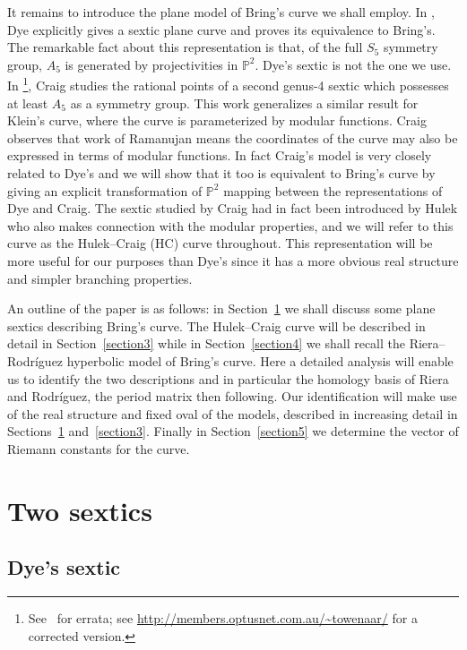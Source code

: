 \documentclass[pdftex]{sigma}
\numberwithin{equation}{section}
\begin{document}
It remains to introduce the plane model of Bring's curve we shall employ. In \cite{dye}, Dye
explicitly gives a sextic plane curve and proves its equivalence to Bring's.
The remarkable fact about this representation is that, of the full $S_5$ symmetry group, $A_5$ is
generated by projectivities in $\mathbb{P}^2$. Dye's sextic is not the one we use.
In \cite{craig}\footnote{See~\cite{craig04} for errata; see
 \url{http://members.optusnet.com.au/~towenaar/} for a corrected version.}, Craig studies the rational points of a second genus-4
sextic which possesses at least $A_5$ as a symmetry group. This work generalizes a similar
result for Klein's curve, where the curve is parameterized by modular functions. Craig
observes that work of Ramanujan means the coordinates of the curve may also be expressed in terms
of modular functions. In fact
Craig's model is very closely related to Dye's and we will
show that it too is equivalent to Bring's curve by giving an explicit
transformation of $\mathbb{P}^2$ mapping between the representations of Dye and Craig.
The sextic studied by Craig had in fact been introduced by Hulek \cite[p.~82]{hulek85}
who also makes connection with the modular properties, and we will refer to this curve as the Hulek--Craig
(HC) curve throughout. This representation will be more useful for our purposes than Dye's
since it has a more obvious real structure and simpler branching
properties.

An outline of the paper is as follows: in Section~\ref{section2} we shall discuss some plane sextics describing Bring's curve.
The Hulek--Craig curve will be described in detail in Section~\ref{section3} while in Section~\ref{section4} we shall recall the Riera--Rodr\'iguez
hyperbolic model of Bring's curve. Here a detailed analysis will enable us to identify the two descriptions
and in particular the homology basis of Riera and Rodr\'iguez, the period matrix then following. Our identif\/ication will make use of the real structure and f\/ixed oval of the models, described in increasing detail in Sections~\ref{section2} and~\ref{section3}. Finally in
Section~\ref{section5} we determine the vector of Riemann constants for the curve.


\section{Two sextics} \label{section2}

\subsection{Dye's sextic}\label{section2.1}
\end{document}
